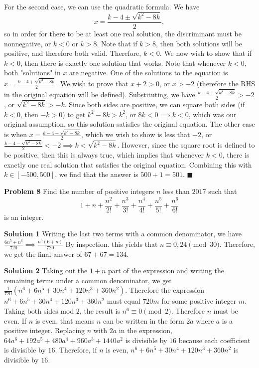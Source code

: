 \documentclass[a4paper,11pt]{article}
\begin{document}
For the second case, we can use the quadratic formula. We have \[x = \frac{k-4 \pm \sqrt{k^2-8k}}2,\] so in order for there to be at least one real solution, the discriminant must be nonnegative, or $k < 0$ or $k > 8$. Note that if $k > 8$, then both solutions will be positive, and therefore both valid. Therefore, $k < 0$. We now wish to show that if $k < 0$, then there is exactly one solution that works. Note that whenever $k < 0$, both "solutions" in $x$ are negative. One of the solutions to the equation is $x = \frac{k-4 + \sqrt{k^2-8k}}2$. We wish to prove that $x + 2 > 0$, or $x > -2$ (therefore the RHS in the original equation will be defined). Substituting, we have $\frac{k-4 + \sqrt{k^2-8k}}2 > -2$, or $\sqrt{k^2 - 8k} > -k$. Since both sides are positive, we can square both sides (if $k < 0$, then $-k > 0$) to get $k^2-8k > k^2$, or $8k < 0 \implies k < 0$, which was our original assumption, so this solution satisfies the original equation. The other case is when $x = \frac{k-4 - \sqrt{k^2-8k}}2$, which we wish to show is less that $-2$, or $\frac{k-4 - \sqrt{k^2-8k}}2 < -2 \implies k < \sqrt{k^2-8k}$. However, since the square root is defined to be positive, then this is always true, which implies that whenever $k < 0$, there is exactly one real solution that satisfies the original equation. Combining this with $k \in [-500, 500]$, we find that the answer is $500 + 1 = \boxed{501}$. \hfill $\blacksquare$

\textbf{Problem 8}
Find the number of positive integers $n$ less than $2017$ such that \[1+n+\frac{n^2}{2!}+\frac{n^3}{3!}+\frac{n^4}{4!}+\frac{n^5}{5!}+\frac{n^6}{6!}\] is an integer.

\textbf{Solution 1}
Writing the last two terms with a common denominator, we have $\frac{6n^5+n^6}{720} \implies \frac{n^5(6+n)}{720}$ By inspection. this yields that $n \equiv 0, 24 \pmod{30}$. Therefore, we get the final answer of $67 + 67 = \boxed{134}$.

\textbf{Solution 2}
Taking out the $1+n$ part of the expression and writing the remaining terms under a common denominator, we get $\frac{1}{720}(n^6+6n^5+30n^4+120n^3+360n^2)$. Therefore the expression $n^6+6n^5+30n^4+120n^3+360n^2$ must equal $720m$ for some positive integer $m$. Taking both sides mod $2$, the result is $n^6 \equiv 0 \pmod{2}$. Therefore $n$ must be even. If $n$ is even, that means $n$ can be written in the form $2a$ where $a$ is a positive integer. Replacing $n$ with $2a$ in the expression, $64a^6+192a^5+480a^4+960a^3+1440a^2$ is divisible by $16$ because each coefficient is divisible by $16$. Therefore, if $n$ is even, $n^6+6n^5+30n^4+120n^3+360n^2$ is divisible by $16$.
\end{document}
